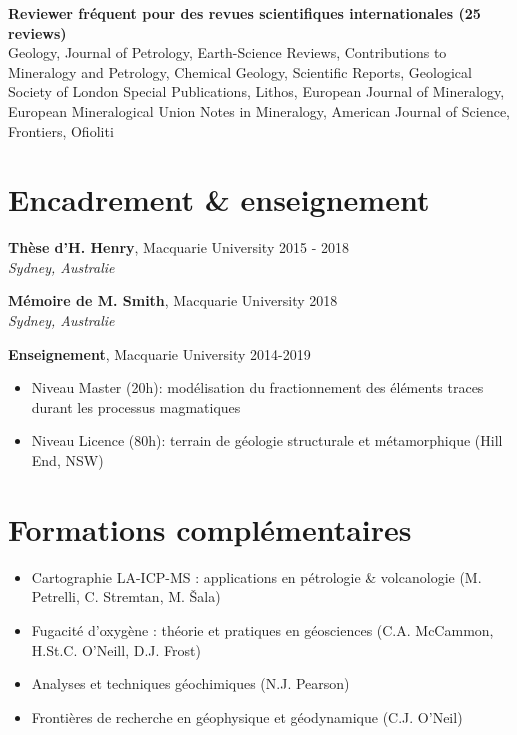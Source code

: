 \documentclass[a4paper,11pt]{article}
\begin{document}
    \textbf{Reviewer fréquent pour des revues scientifiques internationales (25 reviews)}\\
    Geology, Journal of Petrology, Earth-Science Reviews, Contributions to Mineralogy and Petrology, Chemical Geology, Scientific Reports, Geological Society of London Special Publications, Lithos, European Journal of Mineralogy, European Mineralogical Union Notes in Mineralogy, American Journal of Science, Frontiers, Ofioliti

\section{Encadrement \& enseignement}
    \textbf{Thèse d'H. Henry}, Macquarie University
    \hfill {2015 - 2018}\\ 
    \hfill \textit{Sydney, Australie}

    \textbf{Mémoire de M. Smith}, Macquarie University
    \hfill {2018}\\ 
    \hfill \textit{Sydney, Australie}

\textbf{Enseignement}, Macquarie University
\hfill {2014-2019}
    \begin{itemize}[label={},itemsep=0pt,parsep=0pt]
        \item Niveau Master (20h): modélisation du fractionnement des éléments traces durant les processus magmatiques 
        \item Niveau Licence (80h): terrain de géologie structurale et métamorphique (Hill End, NSW)
    \end{itemize}

\section{Formations complémentaires}

    \begin{itemize}[label={},itemsep=0pt,parsep=0pt]
        \item Cartographie LA-ICP-MS : applications en pétrologie \& volcanologie (M. Petrelli, C. Stremtan, M. Šala)
        \item Fugacité d’oxygène : théorie et pratiques en géosciences (C.A. McCammon, H.St.C. O’Neill, D.J. Frost)
        \item Analyses et techniques géochimiques (N.J. Pearson)
        \item Frontières de recherche en géophysique et géodynamique (C.J. O’Neil)
    \end{itemize}
    
\vfill  
{}
\end{document}
